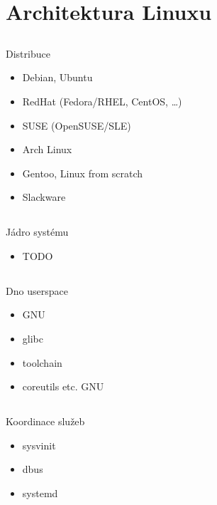 \documentclass{beamer}
\begin{document}
\section{Architektura Linuxu}

\subsection{}
\begin{frame}{Distribuce}
\begin{itemize}
\item Debian, Ubuntu
\item RedHat (Fedora/RHEL, CentOS, \dots)
\item SUSE (OpenSUSE/SLE)
\item Arch Linux
\item Gentoo, Linux from scratch
\item Slackware
\end{itemize}
\end{frame}

\subsection{}
\begin{frame}{Jádro systému}
\begin{itemize}
\item TODO
\end{itemize}
\end{frame}

\subsection{}
\begin{frame}{Dno userspace}
\begin{itemize}
\item GNU
\item glibc
\item toolchain
\item coreutils etc. GNU
\end{itemize}
\end{frame}

\subsection{}
\begin{frame}{Koordinace služeb}
\begin{itemize}
\item sysvinit
\item dbus
\item systemd
\end{itemize}
\end{frame}
\end{document}
